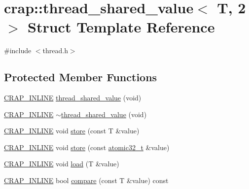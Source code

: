 \hypertarget{structcrap_1_1thread__shared__value_3_01_t_00_012_01_4}{\section{crap\+:\+:thread\+\_\+shared\+\_\+value$<$ T, 2 $>$ Struct Template Reference}
\label{structcrap_1_1thread__shared__value_3_01_t_00_012_01_4}
}


{\ttfamily \#include $<$thread.\+h$>$}

\subsection*{Protected Member Functions}
\begin{DoxyCompactItemize}
\item 
\hyperlink{config__x86_8h_a5a40526b8d842e7ff731509998bb0f1c}{C\+R\+A\+P\+\_\+\+I\+N\+L\+I\+N\+E} \hyperlink{structcrap_1_1thread__shared__value_3_01_t_00_012_01_4_ab291f49e1dc43b493155c9c47758d832}{thread\+\_\+shared\+\_\+value} (void)
\item 
\hyperlink{config__x86_8h_a5a40526b8d842e7ff731509998bb0f1c}{C\+R\+A\+P\+\_\+\+I\+N\+L\+I\+N\+E} \hyperlink{structcrap_1_1thread__shared__value_3_01_t_00_012_01_4_a280d3e4fdb078d34301a0810f1b6bfef}{$\sim$thread\+\_\+shared\+\_\+value} (void)
\item 
\hyperlink{config__x86_8h_a5a40526b8d842e7ff731509998bb0f1c}{C\+R\+A\+P\+\_\+\+I\+N\+L\+I\+N\+E} void \hyperlink{structcrap_1_1thread__shared__value_3_01_t_00_012_01_4_a575b6bcb7e1633580d50971eb2578aaf}{store} (const T \&value)
\item 
\hyperlink{config__x86_8h_a5a40526b8d842e7ff731509998bb0f1c}{C\+R\+A\+P\+\_\+\+I\+N\+L\+I\+N\+E} void \hyperlink{structcrap_1_1thread__shared__value_3_01_t_00_012_01_4_a1c11150d8449c986275173d64682d656}{store} (const \hyperlink{structcrap_1_1atomic32__t}{atomic32\+\_\+t} \&value)
\item 
\hyperlink{config__x86_8h_a5a40526b8d842e7ff731509998bb0f1c}{C\+R\+A\+P\+\_\+\+I\+N\+L\+I\+N\+E} void \hyperlink{structcrap_1_1thread__shared__value_3_01_t_00_012_01_4_a3dbf395753ee74f6e98e9e3b995408c6}{load} (T \&value)
\item 
\hyperlink{config__x86_8h_a5a40526b8d842e7ff731509998bb0f1c}{C\+R\+A\+P\+\_\+\+I\+N\+L\+I\+N\+E} bool \hyperlink{structcrap_1_1thread__shared__value_3_01_t_00_012_01_4_a4e6677ba6d1dc082fbeb7868c74d409d}{compare} (const T \&value) const 

\end{DoxyCompactItemize}
